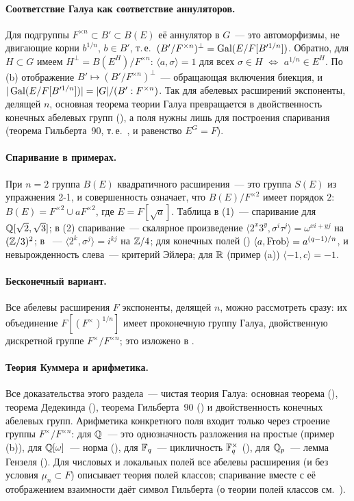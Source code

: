 \paragraph{Соответствие Галуа как соответствие аннуляторов.} Для подгруппы $F^{\times n}\subset B'\subset B(E)$ её
аннулятор в $G$~--- это автоморфизмы, не двигающие корни $b^{1/n}$, $b\in B'$, т.\,е.\ $(B'/F^{\times n})^\perp=
\operatorname{Gal}(E/F[B'^{1/n}])$. Обратно, для $H\subset G$ имеем $H^\perp=B(E^H)/F^{\times n}$: $\langle a,\sigma\rangle=1$ для всех
$\sigma\in H$ $\iff$ $a^{1/n}\in E^H$. По (b) отображение $B'\mapsto(B'/F^{\times n})^\perp$~--- обращающая
включения биекция, и $|\operatorname{Gal}(E/F[B'^{1/n}])|=|G|/(B':F^{\times n})$. Так для абелевых расширений экспоненты, делящей $n$,
основная теорема теории Галуа превращается в двойственность конечных абелевых групп (), а поля нужны лишь для
построения спаривания (теорема Гильберта~90, т.\,е.\ , и равенство $E^G=F$).

\paragraph{Спаривание в примерах.} При $n=2$ группа $B(E)$ квадратичного расширения~--- это группа $S(E)$ из упражнения 2-1,
и совершенность означает, что $B(E)/F^{\times2}$ имеет порядок $2$: $B(E)=F^{\times2}\cup aF^{\times2}$, где
$E=F[\sqrt a]$. Таблица в (1)~--- спаривание для $\mathbb Q[\sqrt2,\sqrt3]$; в (2) спаривание~--- скалярное
произведение $\langle2^x3^y,\sigma^i\tau^j\rangle=\omega^{xi+yj}$ на $(\mathbb Z/3)^2$; в ~--- $\langle2^k,\sigma^j\rangle=
i^{kj}$ на $\mathbb Z/4$; для конечных полей () $\langle a,\operatorname{Frob}\rangle=a^{(q-1)/n}$, и невырожденность слева~--- критерий
Эйлера; для $\mathbb R$ (пример (a)) $\langle-1,c\rangle=-1$.

\paragraph{Бесконечный вариант.} Все абелевы расширения $F$ экспоненты, делящей $n$, можно рассмотреть сразу: их
объединение $F[(F^\times)^{1/n}]$ имеет проконечную группу Галуа, двойственную дискретной группе $F^\times/F^{\times n}$;
это изложено в .

\paragraph{Теория Куммера и арифметика.} Все доказательства этого раздела~--- чистая теория Галуа: основная теорема
(), теорема Дедекинда (), теорема Гильберта~90 () и двойственность конечных абелевых групп. Арифметика
конкретного поля входит только через строение группы $F^\times/F^{\times n}$: для $\mathbb Q$~--- это однозначность разложения
на простые (пример (b)), для $\mathbb Q[\omega]$~--- норма (), для $\mathbb F_q$~--- цикличность $\mathbb F_q^\times$ (), для
$\mathbb Q_p$~--- лемма Гензеля (). Для числовых и локальных полей все абелевы расширения (и без условия $\mu_n\subset F$)
описывает теория полей классов; спаривание  вместе с её отображением взаимности даёт символ Гильберта (о теории
полей классов см.\ ).
